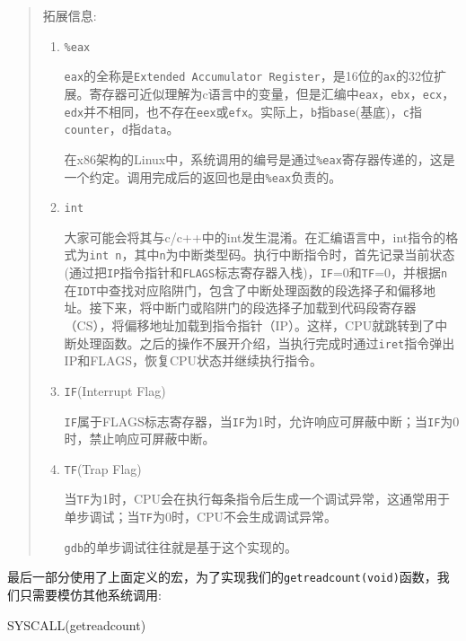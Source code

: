 \documentclass[
]{article}
\newenvironment{Shaded}{}{}
\newcommand{\NormalTok}[1]{#1}
\newcommand{\OperatorTok}[1]{\textcolor[rgb]{0.40,0.40,0.40}{#1}}
\begin{document}
\begin{quote}
  拓展信息:

  \begin{enumerate}
    \def\labelenumi{\arabic{enumi}.}
    \item
          \texttt{\%eax}

          \texttt{eax}的全称是\texttt{Extended\ Accumulator\ Register}，是16位的\texttt{ax}的32位扩展。寄存器可近似理解为c语言中的变量，但是汇编中\texttt{eax}，\texttt{ebx}，\texttt{ecx}，\texttt{edx}并不相同，也不存在\texttt{eex}或\texttt{efx}。实际上，\texttt{b}指\texttt{base}(基底)，\texttt{c}指\texttt{counter}，\texttt{d}指\texttt{data}。

          在x86架构的Linux中，系统调用的编号是通过\texttt{\%eax}寄存器传递的，这是一个约定。调用完成后的返回也是由\texttt{\%eax}负责的。
    \item
          \texttt{int}

          大家可能会将其与c/c++中的int发生混淆。在汇编语言中，int指令的格式为\texttt{int\ n}，其中\texttt{n}为中断类型码。执行中断指令时，首先记录当前状态(通过把\texttt{IP}指令指针和\texttt{FLAGS}标志寄存器入栈)，\texttt{IF}=0和\texttt{TF}=0，并根据\texttt{n}在\texttt{IDT}中查找对应陷阱门，包含了中断处理函数的段选择子和偏移地址。接下来，将中断门或陷阱门的段选择子加载到代码段寄存器（CS），将偏移地址加载到指令指针（IP）。这样，CPU就跳转到了中断处理函数。之后的操作不展开介绍，当执行完成时通过\texttt{iret}指令弹出IP和FLAGS，恢复CPU状态并继续执行指令。
    \item
          \texttt{IF}(Interrupt Flag)

          \texttt{IF}属于FLAGS标志寄存器，当\texttt{IF}为1时，允许响应可屏蔽中断；当\texttt{IF}为0时，禁止响应可屏蔽中断。
    \item
          \texttt{TF}(Trap Flag)

          当\texttt{TF}为1时，CPU会在执行每条指令后生成一个调试异常，这通常用于单步调试；当\texttt{TF}为0时，CPU不会生成调试异常。

          \texttt{gdb}的单步调试往往就是基于这个实现的。
  \end{enumerate}
\end{quote}

最后一部分使用了上面定义的宏，为了实现我们的\texttt{getreadcount(void)}函数，我们只需要模仿其他系统调用:

\begin{Shaded}
  \begin{Highlighting}[]
    \NormalTok{SYSCALL}\OperatorTok{(}\NormalTok{getreadcount}\OperatorTok{)}
  \end{Highlighting}
\end{Shaded}
\end{document}
